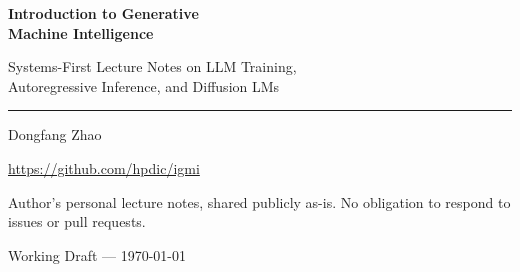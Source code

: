\documentclass[11pt, oneside]{book}
\begin{document}
\frontmatter
\hypersetup{pageanchor=false}
\begin{titlepage}
    \vspace*{2.2cm}
    {\sffamily\Huge\bfseries\color{igmi-accent} Introduction to Generative\\Machine Intelligence\par}
    \vspace{0.8cm}
    {\sffamily\Large\color{igmi-muted} Systems-First Lecture Notes on LLM Training,\\Autoregressive Inference, and Diffusion LMs\par}
    \vspace{1.2cm}
    {\color{igmi-rule}\rule{\linewidth}{0.8pt}}
    \vspace{1.2cm}
    {\sffamily\large Dongfang Zhao\par}
    \vspace{0.2cm}
    {\sffamily\normalsize\color{igmi-muted} \par}
    \vspace{0.15cm}
    {\sffamily\normalsize\color{igmi-muted} \url{https://github.com/hpdic/igmi}\par}
    \vfill
    {\sffamily\footnotesize\color{igmi-muted} Author's personal lecture notes, shared publicly as-is. No obligation to respond to issues or pull requests.\par}
    \vspace{0.25cm}
    {\sffamily\small\color{igmi-muted} Working Draft --- \today\par}
\end{titlepage}
\hypersetup{pageanchor=true}

\tableofcontents

\mainmatter


% 
% 
\end{document}
